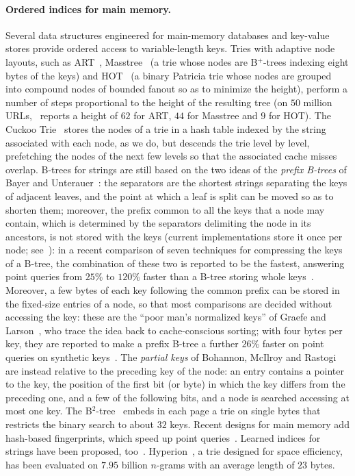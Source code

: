 \documentclass[a4paper]{article}
\newcommand{\?}{\mskip1.5mu}
\begin{document}
\paragraph{Ordered indices for main memory.} Several data structures engineered for main-memory databases and key-value stores 
provide ordered access to variable-length keys. Tries with adaptive node layouts, such as ART~\cite{Leis2013Adaptive}, 
Masstree~\cite{Mao2012Cache} (a trie whose nodes are B$^+$-trees indexing eight bytes of the keys) and HOT~\cite{Binna2018HOT,Binna2022Height} (a binary Patricia trie whose nodes are 
grouped into compound nodes of bounded fanout so as to minimize the height), perform a number of steps proportional to the height of the resulting tree
(on $50$ million URLs,~\cite{Binna2022Height} reports a height of $62$ for ART, $44$ for Masstree and $9$ for HOT).
The Cuckoo Trie~\cite{Zeitak2021Cuckoo} stores the nodes of a trie in a hash table indexed by the string associated with each node, as we do, 
but descends the trie level by level, prefetching the nodes of the next few levels so that the associated cache misses overlap. 
B-trees for strings are still based on the two ideas of the \emph{prefix B-trees} of Bayer and Unterauer~\cite{Bayer1977Prefix}: the 
separators are the shortest strings separating the keys of adjacent leaves, and the point at which a leaf is split can be moved 
so as to shorten them; moreover, the prefix common to all the keys that a node may contain, which is determined by the separators 
delimiting the node in its ancestors, is not stored with the keys (current implementations store it once per 
node; see~\cite[Section~3.5]{Graefe2011Modern}): in a recent comparison of seven techniques for compressing the keys of a B-tree, 
the combination of these two is reported to be the fastest, answering point queries from $25$\% to $120$\% faster 
than a B-tree storing whole keys~\cite{Gao2024Revisiting,Sun2026Evaluation}. Moreover, a few bytes of each key following the common prefix can be stored in the 
fixed-size entries of a node, so that most comparisons are decided without accessing the key: these are the ``poor man's normalized keys'' 
of Graefe and Larson~\cite{Graefe2001Btree}, who trace the idea back to cache-conscious sorting; with four bytes per key, they are 
reported to make a prefix B-tree a further $26$\% faster on point queries on synthetic keys~\cite{Sun2026Evaluation}. 
The \emph{partial keys} of Bohannon, McIlroy and Rastogi~\cite{Bohannon2001Main} are instead relative to the preceding key of the node: an entry contains 
a pointer to the key, the position of the first bit (or byte) in which the key differs from the preceding one, and a few of the following bits, 
and a node is searched accessing at most one key. 
The B$^2$-tree~\cite{Schmeisser2022B2} embeds in each page a trie on single bytes that restricts the binary search to about $32$ keys. 
Recent designs for main memory
add hash-based fingerprints, which speed up point queries~\cite{Muller2025BTrees,Chen2025FB}. 
Learned indices for strings have been proposed, too~\cite{Wang2020SIndex,Spector2021Bounding,Yang2024LITS,Yang2026Learned}. 
Hyperion~\cite{Masker2019Hyperion}, a trie designed for space efficiency, has been evaluated on $7.95$ billion $n$-grams with an 
average length of $23$ bytes. 
\end{document}
